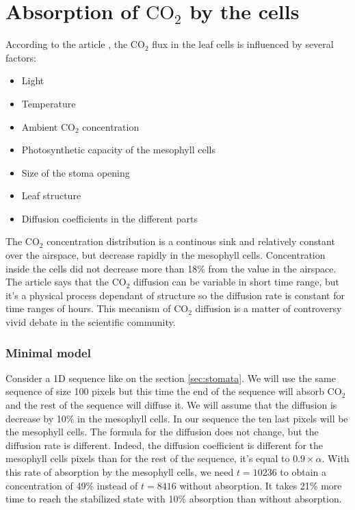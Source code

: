 \section{Absorption of \texorpdfstring{$\mathrm{CO_2}$}{CO2} by the cells}

According to the article \cite{Aalto2002}, the $\mathrm{CO_2}$ flux in the leaf cells 
is influenced by several factors:

\begin{itemize}
    \item Light
    \item Temperature
    \item Ambient $\mathrm{CO_2}$ concentration
    \item Photosynthetic capacity of the mesophyll cells
    \item Size of the stoma opening
    \item Leaf structure
    \item Diffusion coefficients in the different parts
\end{itemize}

The $\mathrm{CO_2}$ concentration distribution is a continous sink and relatively constant 
over the airspace, but decrease rapidly in the mesophyll cells. Concentration inside the 
cells did not decrease more than 18\% from the value in the airspace. The article 
\cite{Kaldenhoff2012} says that the $\mathrm{CO_2}$ diffusion can be variable
in short time range, but it's a physical process dependant of structure so the 
diffusion rate is constant for time ranges of hours. This mecanism of $\mathrm{CO_2}$ 
diffusion is a matter of controversy vivid debate in the scientific community.

\subsubsection{Minimal model}

Consider a 1D sequence like on the section \ref{sec:stomata}. We will use the same sequence
of size 100 pixels but this time the end of the sequence will absorb $\mathrm{CO_2}$ and 
the rest of the sequence will diffuse it. We will assume that the diffusion is decrease by 
10\% in the mesophyll cells. In our sequence the ten last pixels will be the mesophyll 
cells. The formula for the diffusion does not change, but the diffusion rate is different. 
Indeed, the diffusion coefficient is different for the mesophyll cells pixels than for the 
rest of the sequence, it's equal to $0.9 \times \alpha$. With this rate of absorption by 
the mesophyll cells, we need $t=10236$ to obtain a concentration of 49\% instead of 
$t=8416$ without absorption. It takes 21\% more time to reach the stabilized state with 
10\% absorption than without absorption.

